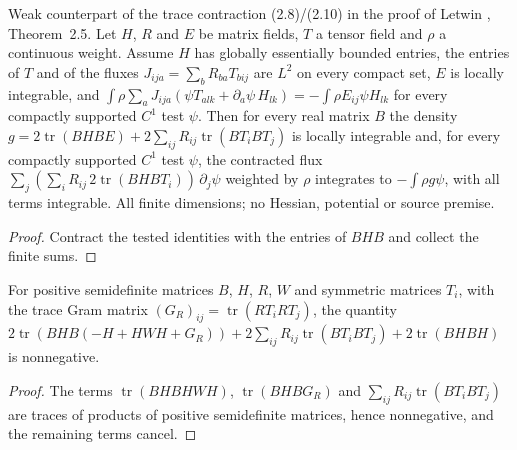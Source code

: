 \begin{lemma}
  \label{lem:letwin-weak-trace-contraction}
  \leanok
  Weak counterpart of the trace contraction (2.8)/(2.10) in the proof of Letwin \cite{Letwin2026QuadraticKLS}, Theorem~2.5. Let $H$,
  $R$ and $E$ be matrix fields, $T$ a tensor field and $\rho$ a continuous weight. Assume $H$ has globally essentially bounded entries, the
  entries of $T$ and of the fluxes $J_{ija}=\sum_bR_{ba}T_{bij}$ are $L^2$ on every compact set, $E$ is locally integrable, and
  $\int\rho\sum_aJ_{ija}(\psi T_{alk}+\partial_a\psi\,H_{lk})=-\int\rho E_{ij}\psi H_{lk}$ for every compactly supported $C^1$ test $\psi$.
  Then for every real matrix $B$ the density $g=2\operatorname{tr}(BHBE)+2\sum_{ij}R_{ij}\operatorname{tr}(BT_iBT_j)$ is locally
  integrable and, for every compactly supported $C^1$ test $\psi$, the contracted flux
  $\sum_j(\sum_iR_{ij}\,2\operatorname{tr}(BHBT_i))\,\partial_j\psi$ weighted by $\rho$ integrates to $-\int\rho g\psi$, with all terms
  integrable. All finite dimensions; no Hessian, potential or source premise.
\end{lemma}
\begin{proof}
  \leanok
  Contract the tested identities with the entries of $BHB$ and collect the finite sums.
\end{proof}

\begin{lemma}
  \label{lem:letwin-trace-density-positivity}
  \leanok
  For positive semidefinite matrices $B$, $H$, $R$, $W$ and symmetric matrices $T_i$, with the trace Gram matrix
  $(G_R)_{ij}=\operatorname{tr}(RT_iRT_j)$, the quantity
  $2\operatorname{tr}(BHB(-H+HWH+G_R))+2\sum_{ij}R_{ij}\operatorname{tr}(BT_iBT_j)+2\operatorname{tr}(BHBH)$ is nonnegative.
\end{lemma}
\begin{proof}
  \leanok
  The terms $\operatorname{tr}(BHBHWH)$, $\operatorname{tr}(BHBG_R)$ and $\sum_{ij}R_{ij}\operatorname{tr}(BT_iBT_j)$ are traces of products
  of positive semidefinite matrices, hence nonnegative, and the remaining terms cancel.
\end{proof}

